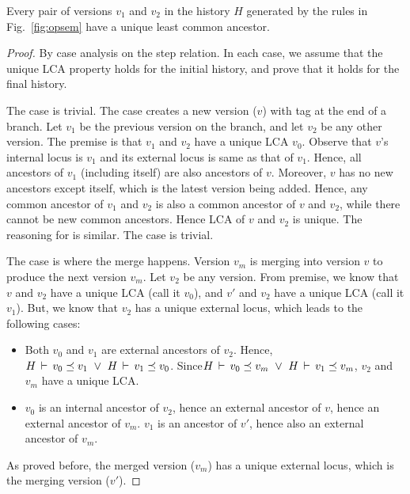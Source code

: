 \begin{theorem} 
Every pair of versions $v_1$ and $v_2$ in the history $H$ generated by
the rules in Fig.~\ref{fig:opsem} have a unique least
common ancestor. 
\end{theorem}
\begin{proof}
By case analysis on the step relation. In each case, we assume that
the unique LCA property holds for the initial history, and prove that
it holds for the final history.

The  case is trivial. The  case
creates a new version ($v$) with  tag at the end of a branch.
Let $v_1$ be the previous version on the branch, and let $v_2$ be any
other version. The premise is that $v_1$ and $v_2$ have a unique LCA
$v_0$. Observe that $v$'s internal locus is $v_1$ and its external
locus is same as that of $v_1$. Hence, all ancestors of $v_1$
(including itself) are also ancestors of $v$. Moreover, $v$ has no new
ancestors except itself, which is the latest version being added.
Hence, any common ancestor of $v_1$ and $v_2$ is also a common
ancestor of $v$ and $v_2$, while there cannot be new common ancestors.
Hence LCA of $v$ and $v_2$ is unique. The reasoning for
 is similar. The  case is trivial. 

The  case is where the merge happens. Version
$v_m$ is merging into version $v$ to produce the next version $v_m$.
Let $v_2$ be any version. From premise, we know that $v$ and $v_2$
have a unique LCA (call it $v_0$), and $v'$ and $v_2$ have a unique
LCA (call it $v_1$). But, we know that $v_2$ has a unique external
locus, which leads to the following cases:
\begin{itemize}
  \item Both $v_0$ and $v_1$ are external ancestors of $v_2$. Hence,
  $H\,\vdash\,v_0 \preceq v_1 ~\vee~ H\,\vdash\,v_1 \preceq v_0$.
  Since$H\,\vdash\,v_0 \preceq v_m ~\vee~ H\,\vdash\,v_1 \preceq v_m$, 
  $v_2$ and $v_m$ have a unique LCA.

  \item $v_0$ is an internal ancestor of $v_2$, hence an external
  ancestor of $v$, hence an external ancestor of $v_m$. $v_1$ is
  an ancestor of $v'$, hence also an external ancestor of $v_m$. 
\end{itemize}


As proved
before, the merged version ($v_m$) has a unique external locus, which
is the merging version ($v'$).
\end{proof}

